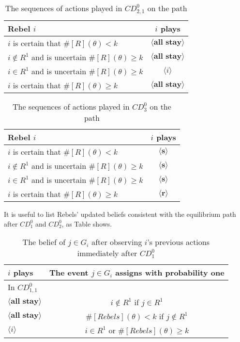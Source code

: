 \documentclass[12pt,letter]{article}
\theoremstyle{definition}
\theoremstyle{remark}
\theoremstyle{claim}
\begin{document}
\begin{table}[!htbp]
\caption{The sequences of actions played in $CD^0_{2,1}$ on the path}
\label{Table_cd021}
\begin{center}
\begin{tabular}{l c}
Rebel $i$ 	 	&  	$i$ plays		 \\
\hline
\hline
$i$ is certain that $\#[R](\theta)<k$ 	& 	$\langle \textbf{all stay} \rangle$	\\
$i\notin R^{1}$ and is uncertain $\#[R](\theta)\geq k$	& 	$\langle \textbf{all stay} \rangle$	\\
$i\in R^{1}$ and is uncertain $\#[R](\theta)\geq k$ &  $\langle i \rangle$  \\
$i$ is certain that $\#[R](\theta)\geq k$ &  $\langle \textbf{all stay} \rangle$  \\
\hline
\end{tabular}
\end{center}
\end{table}

\begin{table}[!htbp]
\caption{The sequences of actions played in $CD^0_{3}$ on the path}
\label{Table_cd03v}
\begin{center}
\begin{tabular}{l c}
Rebel $i$ 	 	&  	$i$ plays		 \\
\hline
\hline
$i$ is certain that $\#[R](\theta)<k$ 	& 	$\langle \textbf{s} \rangle$	\\
$i\notin R^{1}$ and is uncertain $\#[R](\theta)\geq k$	& 	$\langle \textbf{s} \rangle$	\\
$i\in R^{1}$ and is uncertain $\#[R](\theta)\geq k$ &  $\langle \textbf{s} \rangle$  \\
$i$ is certain that $\#[R](\theta)\geq k$ &  $\langle \textbf{r} \rangle$  \\
\hline
\end{tabular}
\end{center}
\end{table}
\clearpage

It is useful to list Rebels' updated beliefs consistent with the equilibrium path after $CD^0_1$ and $CD^0_2$, as Table shows.

\begin{table}[!htbp]
\caption{The belief of $j\in G_i$ after observing $i$'s previous actions immediately after $CD^0_{1}$}
\label{Table_blf_up_cd02}
\begin{center}
\begin{tabular}{l | c}
 	$i$ plays	  				  &  The event $j\in G_i$ assigns with probability one\\
\hline
\hline
In $CD^0_{1,1}$	&				  \\
\hline
  $\langle \textbf{all stay} \rangle$	&    $i\notin R^1$ if $j\in R^1$ \\
  $\langle \textbf{all stay} \rangle$	&    $\#[Rebels](\theta)< k$ if $j\notin R^1$\\
  $\langle i \rangle$	&	  $i\in R^1$ or $\#[Rebels](\theta)\geq k$    \\
  \hline
\end{tabular}
\end{center}
\end{table}
\end{document}
